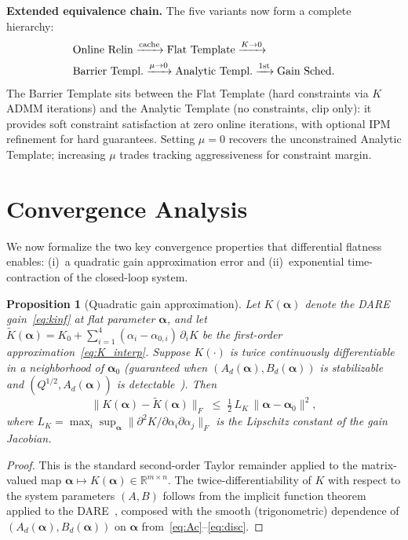 \documentclass[letterpaper, 10pt, conference]{IEEEtran}
\newtheorem{proposition}{Proposition}
\newcommand{\R}{\mathbb{R}}
\newcommand{\balpha}{\bm{\alpha}}
\begin{document}
\textbf{Extended equivalence chain.}
The five variants now form a complete hierarchy:
\begin{align}\label{eq:full_chain}
  &\text{Online Relin}
  \xrightarrow{\text{cache}}
  \text{Flat Template}
  \xrightarrow{K\to 0} \notag \\
  &\text{Barrier Templ.}
  \xrightarrow{\mu\to 0}
  \text{Analytic Templ.}
  \xrightarrow{\text{1st}}
  \text{Gain Sched.}
\end{align}
The Barrier Template sits between the Flat Template
(hard constraints via $K$ ADMM iterations) and the
Analytic Template (no constraints, clip only):
it provides soft constraint satisfaction at zero online
iterations, with optional IPM refinement for hard guarantees.
Setting $\mu = 0$ recovers the unconstrained Analytic
Template; increasing $\mu$ trades tracking aggressiveness
for constraint margin.

\section{Convergence Analysis}\label{sec:convergence}

We now formalize the two key convergence properties that
differential flatness enables: (i)~a quadratic gain
approximation error and (ii)~exponential time-contraction
of the closed-loop system.

\begin{proposition}[Quadratic gain approximation]\label{prop:gain_approx}
Let $K(\balpha)$ denote the DARE gain~\eqref{eq:kinf} at
flat parameter $\balpha$, and let
$\tilde{K}(\balpha) = K_0 + \sum_{i=1}^{4}
(\alpha_i - \alpha_{0,i}) \, \partial_i K$
be the first-order approximation~\eqref{eq:K_interp}.
Suppose $K(\cdot)$ is twice continuously differentiable
in a neighborhood of $\balpha_0$
(guaranteed when $(A_d(\balpha), B_d(\balpha))$ is
stabilizable and $(Q^{1/2}, A_d(\balpha))$ is
detectable~\cite{konstantinov1993}).
Then
\begin{equation}\label{eq:gain_quad}
  \|K(\balpha) - \tilde{K}(\balpha)\|_F
  \;\leq\; \tfrac{1}{2} \, L_K \, \|\balpha - \balpha_0\|^2,
\end{equation}
where $L_K = \max_i \sup_{\balpha} \|\partial^2 K / \partial \alpha_i \partial \alpha_j\|_F$
is the Lipschitz constant of the gain Jacobian.
\end{proposition}

\begin{proof}
This is the standard second-order Taylor remainder applied
to the matrix-valued map $\balpha \mapsto K(\balpha) \in \R^{m \times n}$.
The twice-differentiability of $K$ with respect to
the system parameters $(A, B)$ follows from the implicit
function theorem applied to the DARE~\cite{hewer1971,konstantinov1993},
composed with the smooth (trigonometric) dependence of
$(A_d(\balpha), B_d(\balpha))$ on $\balpha$
from~\eqref{eq:Ac}--\eqref{eq:disc}.
\end{proof}
\end{document}
